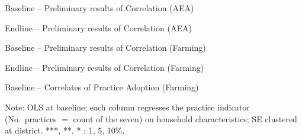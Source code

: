 \documentclass[aspectratio=169]{beamer}
\newcommand{\notefont}{\fontsize{5pt}{6pt}\selectfont}
\begin{document}
\begin{frame}{Baseline -- Preliminary results of Correlation (AEA)}
	\centering
	
\end{frame}

\begin{frame}{Endline -- Preliminary results of Correlation (AEA)}
	\centering
	
\end{frame}

\begin{frame}{Baseline -- Preliminary results of Correlation (Farming)}
	\centering
	
\end{frame}

\begin{frame}{Endline -- Preliminary results of Correlation (Farming)}
	\centering
	
\end{frame}

\begin{frame}{Baseline -- Correlates of Practice Adoption (Farming)}
	\centering
	\begin{minipage}{0.94\textwidth}
		\notefont
		Note: OLS at baseline; each column regresses the practice indicator (No.\ practices
		$=$ count of the seven) on household characteristics; SE clustered at district.
		***, **, * : 1, 5, 10\%.
	\end{minipage}
\end{frame}
\end{document}

